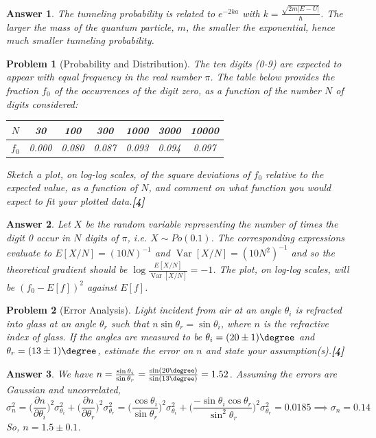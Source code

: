 \documentclass[a4paper]{article}
\DeclareMathOperator{\Var}{Var}
\newtheorem{ans}{Answer}[subsection]
\theoremstyle{new}
\newtheorem{qns}{Problem}[subsection]
\begin{document}
\begin{ans}
The tunneling probability is related to $e^{-2ka}$ with $k=\frac{\sqrt{2m|E-U|}}{\hbar}$. The larger the mass of the quantum particle, $m$, the smaller the exponential, hence much smaller tunneling probability.
\end{ans}
\begin{qns}[Probability and Distribution]
The ten digits (0-9) are expected to appear with equal frequency in the real number $\pi$. The table below provides the fraction $f_0$ of the occurrences of the digit zero, as a function of the number $N$ of digits considered:
\begin{center}
\begin{tabular}{ c |c| c| c| c| c| c}
$N$ & 30 & 100 & 300 & 1000 & 3000 & 10000\\
\hline
$f_0$ & 0.000 & 0.080 & 0.087 & 0.093 & 0.094 & 0.097
\end{tabular}
\end{center}
Sketch a plot, on log-log scales, of the square deviations of $f_0$ relative to the expected value, as a function of $N$, and comment on what function you would expect to fit your plotted data.\hfill\textbf{[4]}
\end{qns}
\begin{ans}
Let $X$ be the random variable representing the number of times the digit 0 occur in $N$ digits of $\pi$, i.e. $X\sim Po(0.1)$. The corresponding expressions evaluate to $E[X/N]=(10N)^{-1}$ and $\Var[X/N]=(10N^2)^{-1}$ and so the theoretical gradient should be $\log\frac{E[X/N]}{\Var[X/N]}=-1$. The plot, on log-log scales, will be $(f_0-E[f])^2$ against $E[f]$.
\end{ans}
\begin{qns}[Error Analysis]
Light incident from air at an angle $\theta_i$ is refracted into glass at an angle $\theta_r$ such that $n\sin\theta_r =\sin\theta_i$, where $n$ is the refractive index of glass. If the angles are measured to be $\theta_i=(20\pm1)\degree$ and $\theta_r=(13\pm1)\degree$, estimate the error on $n$ and state your assumption(s).\hfill\textbf{[4]}
\end{qns}
\begin{ans}
We have $n=\frac{\sin\theta_i}{\sin\theta_r}=\frac{\sin(20\degree)}{\sin(13\degree)}=1.52$. Assuming the errors are Gaussian and uncorrelated,
$$\sigma_n^2=\bigg(\frac{\partial n}{\partial \theta_i}\bigg)^2\sigma_{\theta_i}^2+\bigg(\frac{\partial n}{\partial \theta_r}\bigg)^2\sigma_{\theta_r}^2=\bigg(\frac{\cos\theta_i}{\sin\theta_r}\bigg)^2\sigma_{\theta_i}^2+\bigg(\frac{-\sin\theta_i\cos\theta_r}{\sin^2\theta_r}\bigg)^2\sigma_{\theta_r}^2=0.0185\implies \sigma_n=0.14$$
So, $n=1.5\pm 0.1$.
\end{ans}
\newpage
\end{document}
